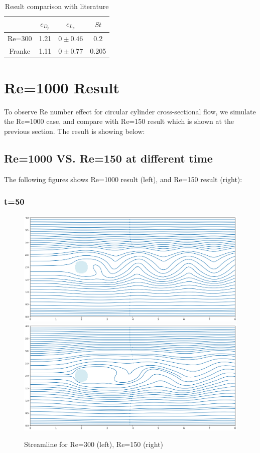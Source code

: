 \documentclass[12pt]{article}
\begin{document}
\begin{table}[ht]
\centering
\caption{Result comparison with literature}
\begin{tabular}{c|ccc}
\toprule
 & $c_{D_p}$ & $c_{L_p}$ & $St$ \\
\midrule
Re=300 & 1.21 & $0 \pm 0.46$ & 0.2 \\
Franke\cite{FRANKE1990237} & 1.11 &  $0 \pm 0.77$ & 0.205 \\
\bottomrule
\end{tabular}
\end{table}


























\newpage
\section{Re=1000 Result}
To observe Re number effect for circular cylinder cross-sectional flow, we simulate the Re=1000 case, and compare with Re=150 result which is shown at the previous section. The result is showing below:

\subsection{Re=1000 VS. Re=150 at different time }
The following figures shows Re=1000 result (left), and Re=150 result (right):


\subsubsection{t=50}
\begin{figure}[H]
    \centering
    \includegraphics[width=0.45\linewidth]{figure/N32_Re1000_8x4_t50/stline_N32_Re1000_8x4_t50.jpg}
    \includegraphics[width=0.45\linewidth]{figure/N32_Re150_8x4_t50/stline_N32_Re150_8x4_t50.jpg}
    \caption{Streamline for Re=300 (left), Re=150 (right)}
\end{figure}
\end{document}
